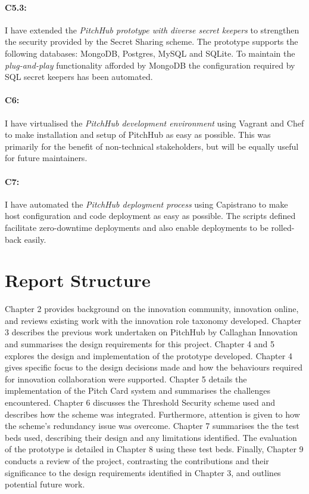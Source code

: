 \paragraph{C5.3:} I have extended the {\em PitchHub prototype with diverse secret keepers} to strengthen the security provided by the Secret Sharing scheme. The prototype supports the following databases: MongoDB, Postgres, MySQL and SQLite. To maintain the \textit{plug-and-play} functionality afforded by MongoDB the configuration required by SQL secret keepers has been automated.

\paragraph{C6:} I have virtualised the {\em PitchHub development environment} using Vagrant and Chef to make installation and setup of PitchHub as easy as possible. This was primarily for the benefit of non-technical stakeholders, but will be equally useful for future maintainers.

\paragraph{C7:} I have automated the {\em PitchHub deployment process} using Capistrano to make host configuration and code deployment as easy as possible. The scripts defined facilitate zero-downtime deployments and also enable deployments to be rolled-back easily.

\section{Report Structure}\label{S:structure}

Chapter 2 provides background on the innovation community,  innovation online, and reviews existing work with the innovation role taxonomy developed. Chapter 3 describes the previous work undertaken on PitchHub by Callaghan Innovation and summarises the design requirements for this project. Chapter 4 and 5 explores the design and implementation of the prototype developed. Chapter 4 gives specific focus to the design decisions made and how the behaviours required for innovation collaboration were supported. Chapter 5 details the implementation of the Pitch Card system and summarises the challenges encountered. Chapter 6 discusses the Threshold Security scheme used and describes how the scheme was integrated. Furthermore, attention is given to how the scheme's redundancy issue was overcome. Chapter 7 summarises the the test beds used, describing their design and any limitations identified. The evaluation of the prototype is detailed in Chapter 8 using these test beds. Finally, Chapter 9 conducts a review of the project, contrasting the contributions and their significance to the design requirements identified in Chapter 3, and outlines potential future work.
